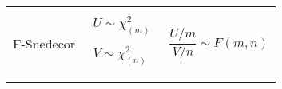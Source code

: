 \documentclass[12pt]{article}
\begin{document}
\begin{tabular}{| c | c | c |}
	\rule{0pt}{0pt} & & \\ \hline \rule{0pt}{0pt} & & \\

	F-Snedecor &
	$\begin{matrix}
		U \sim \chi^2_{(m)} \\
		\\
		V \sim \chi^2_{(n)} \\
	\end{matrix}$ &
	$\dfrac{U/m}{V/n} \sim F(m,n)$ \\

	\rule{0pt}{0pt} & & \\ \hline

\end{tabular}

%
%
%
%
%
%
%
%
%
%
\end{document}
